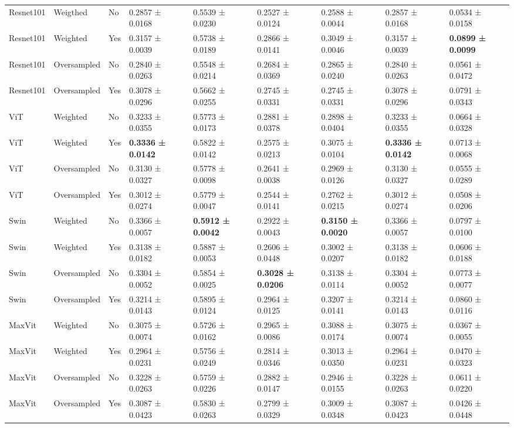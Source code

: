 \documentclass[a4paper,10pt]{book}
\begin{document}
\begin{scriptsize}
\begin{longtable}{@{}l l p{0.5cm} p{1.2cm} p{1.2cm} p{1.2cm} p{1.2cm} p{1.2cm} p{1.2cm}@{}}
\bottomrule
\endlastfoot
            Resnet101 & Weigthed & No & 0.2857 ± 0.0168 & 0.5539 ± 0.0230 & 0.2527 ± 0.0124 & 0.2588 ± 0.0044 & 0.2857 ± 0.0168 & 0.0534 ± 0.0158 \\ 
            Resnet101 & Weighted & Yes & 0.3157 ± 0.0039 & 0.5738 ± 0.0189 & 0.2866 ± 0.0141 & 0.3049 ± 0.0046 & 0.3157 ± 0.0039 & \textbf{0.0899 ± 0.0099} \\ 
            Resnet101 & Oversampled & No & 0.2840 ± 0.0263 & 0.5548 ± 0.0214 & 0.2684 ± 0.0369 & 0.2865 ± 0.0240 & 0.2840 ± 0.0263 & 0.0561 ± 0.0472 \\ 
            Resnet101 & Oversampled & Yes & 0.3078 ± 0.0296 & 0.5662 ± 0.0255 & 0.2745 ± 0.0331 & 0.2745 ± 0.0331 & 0.3078 ± 0.0296 & 0.0791 ± 0.0343 \\ 
            ViT & Weighted & No & 0.3233 ± 0.0355 & 0.5773 ± 0.0173 & 0.2881 ± 0.0378 & 0.2898 ± 0.0404 & 0.3233 ± 0.0355 & 0.0664 ± 0.0328 \\ 
            ViT & Weighted & Yes & \textbf{0.3336 ± 0.0142} & 0.5822 ± 0.0142 & 0.2575 ± 0.0213 & 0.3075 ± 0.0104 &\textbf{0.3336 ± 0.0142} & 0.0713 ± 0.0068 \\ 
            ViT & Oversampled & No & 0.3130 ± 0.0327 & 0.5778 ± 0.0098 & 0.2641 ± 0.0038 & 0.2969 ± 0.0126 & 0.3130 ± 0.0327 & 0.0555 ± 0.0289 \\ 
            ViT & Oversampled & Yes & 0.3012 ± 0.0274 & 0.5779 ± 0.0047 & 0.2544 ± 0.0141 & 0.2762 ± 0.0215 & 0.3012 ± 0.0274 & 0.0508 ± 0.0206 \\ 
            Swin & Weighted & No & 0.3366 ± 0.0057 & \textbf{0.5912 ± 0.0042} & 0.2922 ± 0.0043 & \textbf{0.3150 ± 0.0020} & 0.3366 ± 0.0057 & 0.0797 ± 0.0100 \\ 
            Swin & Weighted & Yes & 0.3138 ± 0.0182 & 0.5887 ± 0.0053 & 0.2606 ± 0.0448 & 0.3002 ± 0.0207 & 0.3138 ± 0.0182 & 0.0606 ± 0.0188 \\ 
            Swin & Oversampled & No & 0.3304 ± 0.0052 & 0.5854 ± 0.0025 & \textbf{0.3028 ± 0.0206} & 0.3138 ± 0.0114 & 0.3304 ± 0.0052 & 0.0773 ± 0.0077 \\ 
            Swin & Oversampled & Yes & 0.3214 ± 0.0143 & 0.5895 ± 0.0124 & 0.2964 ± 0.0125 & 0.3207 ± 0.0141 & 0.3214 ± 0.0143 & 0.0860 ± 0.0116 \\ 
            MaxVit & Weighted & No & 0.3075 ± 0.0074 & 0.5726 ± 0.0162 & 0.2965 ± 0.0086 & 0.3088 ± 0.0174 & 0.3075 ± 0.0074 & 0.0367 ± 0.0055 \\ 
            MaxVit & Weighted & Yes & 0.2964 ± 0.0231 & 0.5756 ± 0.0249 & 0.2814 ± 0.0346 & 0.3013 ± 0.0350 & 0.2964 ± 0.0231 & 0.0470 ± 0.0323 \\ 
            MaxVit & Oversampled & No & 0.3228 ± 0.0263 & 0.5759 ± 0.0226 & 0.2882 ± 0.0147 & 0.2946 ± 0.0155 & 0.3228 ± 0.0263 & 0.0611 ± 0.0220 \\ 
            MaxVit & Oversampled & Yes & 0.3087 ± 0.0423 & 0.5830 ± 0.0263 & 0.2799 ± 0.0329 & 0.3009 ± 0.0348 & 0.3087 ± 0.0423 & 0.0426 ± 0.0448 \\ 
\end{longtable}
\end{scriptsize}
\end{document}

